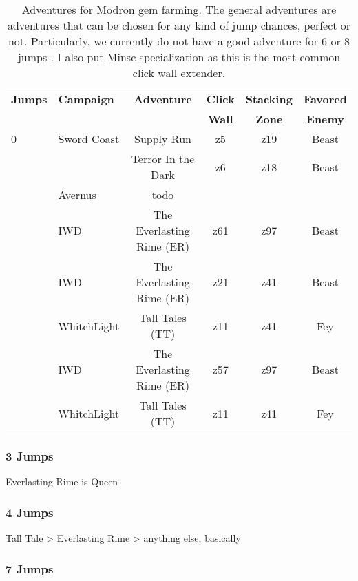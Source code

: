 \documentclass{article}
\begin{document}
\begin{table}[ht!]
\caption{Adventures for Modron \briv gem farming.
The general adventures are adventures that can be chosen for any kind of jump chances, perfect or not.
Particularly, we currently do not have a good adventure for 6 or 8 jumps \briv .
I also put Minsc specialization as this is the most common click wall extender.
}
\label{tbl:adventures}
\begin{small}
\begin{tabular}{ l | l c c c c }
\toprule
\textbf{Jumps} & \textbf{Campaign} & \textbf{Adventure} & \textbf{Click} & \textbf{Stacking} & \textbf{Favored}\\
&&&\textbf{Wall} & \textbf{Zone}& \textbf{Enemy}\\
\midrule
0       & Sword Coast  & Supply Run         & z5 & z19 & Beast \\
        &              & Terror In the Dark & z6 & z18 & Beast\\
        & Avernus      & todo & & &\\
\separatingLine
3       &  IWD & The Everlasting Rime (ER) & z61 & z97 & Beast\\
\separatingLine
4       &  IWD & The Everlasting Rime (ER) & z21 & z41 & Beast\\
        &  WhitchLight & Tall Tales (TT)   & z11 & z41 & Fey\\
\separatingLine
7       &  IWD & The Everlasting Rime (ER) & z57 & z97 & Beast \\
\separatingLine
9       & WhitchLight & Tall Tales (TT)    & z11 & z41 & Fey \\
\bottomrule
\end{tabular}
\end{small}
\end{table}


\subsubsection{3 Jumps}

Everlasting Rime is Queen

\subsubsection{4 Jumps}

Tall Tale > Everlasting Rime > anything else, basically

\subsubsection{7 Jumps}
\end{document}
